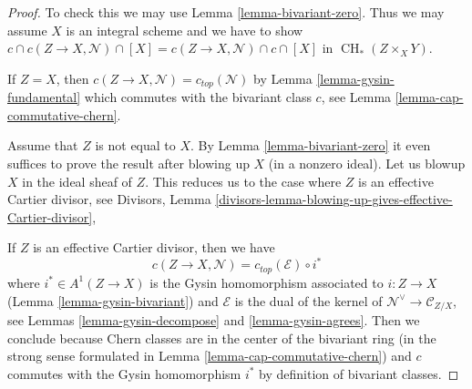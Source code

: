 \documentclass[10pt,a4paper]{amsart}
\theoremstyle{plain}
\theoremstyle{definition}
\theoremstyle{remark}
\numberwithin{equation}{subsection}
\def\CH{\mathop{\mathrm{CH}}\nolimits}
\begin{document}
\begin{proof}
To check this we may use Lemma \ref{lemma-bivariant-zero}.
Thus we may assume $X$ is an integral scheme and we have to show
$c \cap c(Z \to X, \mathcal{N}) \cap [X] =
c(Z \to X, \mathcal{N}) \cap c \cap [X]$ in $\CH_*(Z \times_X Y)$.

\medskip\noindent
If $Z = X$, then $c(Z \to X, \mathcal{N}) = c_{top}(\mathcal{N})$ by
Lemma \ref{lemma-gysin-fundamental} which commutes
with the bivariant class $c$, see Lemma \ref{lemma-cap-commutative-chern}.

\medskip\noindent
Assume that $Z$ is not equal to $X$. By Lemma \ref{lemma-bivariant-zero}
it even suffices to prove the result after blowing up $X$ (in a nonzero ideal).
Let us blowup $X$ in the ideal sheaf of $Z$. This reduces us to the case
where $Z$ is an effective Cartier divisor, see
Divisors, Lemma
\ref{divisors-lemma-blowing-up-gives-effective-Cartier-divisor},

\medskip\noindent
If $Z$ is an effective Cartier divisor, then we have
$$
c(Z \to X, \mathcal{N}) =
c_{top}(\mathcal{E}) \circ i^*
$$
where $i^* \in A^1(Z \to X)$ is the Gysin homomorphism
associated to $i : Z \to X$ (Lemma \ref{lemma-gysin-bivariant})
and $\mathcal{E}$ is the dual of the kernel of
$\mathcal{N}^\vee \to \mathcal{C}_{Z/X}$, see
Lemmas \ref{lemma-gysin-decompose} and \ref{lemma-gysin-agrees}.
Then we conclude because Chern classes are in the center of the
bivariant ring (in the strong sense formulated in
Lemma \ref{lemma-cap-commutative-chern}) and $c$ commutes
with the Gysin homomorphism $i^*$ by definition of bivariant classes.
\end{proof}
\end{document}
